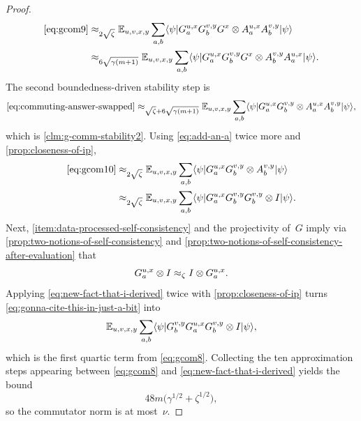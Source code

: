 \begin{proof}
	\begin{align}
		\eqref{eq:gcom9}
		 & \approx_{2\sqrt{\zeta}}
		\mathbb{E}_{u,v,x,y} \sum_{a,b}
		\langle \psi \rvert G_a^{u,x} G_b^{v,y} G^x \otimes A_a^{u,x} A_b^{v,y} \lvert \psi \rangle\nonumber \\
		 & \approx_{6\sqrt{\gamma(m+1)}}
		\mathbb{E}_{u,v,x,y} \sum_{a,b}
		\langle \psi \rvert G_a^{u,x} G_b^{v,y} G^x \otimes A_b^{v,y} A_a^{u,x} \lvert \psi \rangle.
		\label{eq:commuting-answer-swapped}
	\end{align}
	The second boundedness-driven stability step is
	\begin{equation}
		\eqref{eq:commuting-answer-swapped}
		\approx_{\sqrt{\zeta}+6\sqrt{\gamma(m+1)}}
		\mathbb{E}_{u,v,x,y} \sum_{a,b}
		\langle \psi \rvert G_a^{u,x} G_b^{v,y} \otimes A_a^{u,x} A_b^{v,y} \lvert \psi \rangle,
		\label{eq:gcom10}
	\end{equation}
	which is \ref{clm:g-comm-stability2}. Using \ref{eq:add-an-a} twice more and \ref{prop:closeness-of-ip},
	\begin{align}
		\eqref{eq:gcom10}
		 & \approx_{2\sqrt{\zeta}}
		\mathbb{E}_{u,v,x,y} \sum_{a,b}
		\langle \psi \rvert G_a^{u,x} G_b^{v,y} \otimes A_b^{v,y} \lvert \psi \rangle\nonumber \\
		 & \approx_{2\sqrt{\zeta}}
		\mathbb{E}_{u,v,x,y} \sum_{a,b}
		\langle \psi \rvert G_a^{u,x} G_b^{v,y} G_b^{v,y} \otimes I \lvert \psi \rangle.
		\label{eq:gonna-cite-this-in-just-a-bit}
	\end{align}
	Next, \ref{item:data-processed-self-consistency} and the projectivity of~$G$ imply via \ref{prop:two-notions-of-self-consistency} and \ref{prop:two-notions-of-self-consistency-after-evaluation} that
	\begin{equation}\label{eq:new-fact-that-i-derived}
		G_a^{u,x} \otimes I \approx_\zeta I \otimes G_a^{u,x}.
	\end{equation}
	Applying \ref{eq:new-fact-that-i-derived} twice with \ref{prop:closeness-of-ip} turns \ref{eq:gonna-cite-this-in-just-a-bit} into
	\[
		\mathbb{E}_{u,v,x,y} \sum_{a,b}
		\langle \psi \rvert G_b^{v,y} G_a^{u,x} G_b^{v,y} \otimes I \lvert \psi \rangle,
	\]
	which is the first quartic term from \ref{eq:gcom8}. Collecting the ten approximation steps appearing between \ref{eq:gcom8} and \ref{eq:new-fact-that-i-derived} yields the bound
	\[
		48m\bigl(\gamma^{1/2}+\zeta^{1/2}\bigr),
	\]
	so the commutator norm is at most~$\nu$.
\end{proof}

